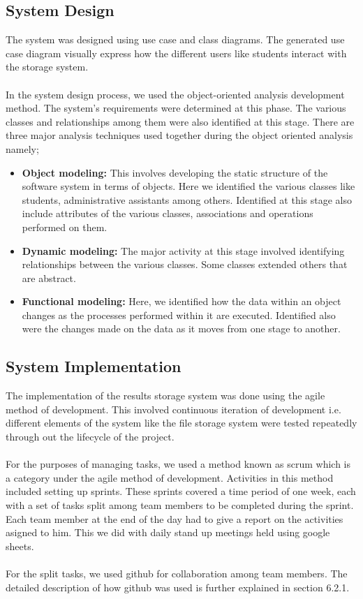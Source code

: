\subsection{System Design}
The system was designed using use case and class diagrams. The generated use case diagram visually express how the different users like students interact with the storage system. \\~\\
In the system design process, we used the object-oriented analysis development method. The system’s requirements were determined at this phase. The various classes and relationships among them were also identified at this stage. There are three major analysis techniques used together during the object oriented analysis namely;
\begin{itemize}
\item \textbf{Object modeling:} This involves developing the static structure of the software system in terms of objects. Here we identified the various classes like students, administrative assistants among others. Identified at this stage also include attributes of the various classes, associations and operations performed on them.
\item \textbf{Dynamic modeling:} The major activity at this stage involved identifying relationships between the various classes. Some classes extended others that are abstract.  
\item \textbf{Functional modeling:} Here, we identified how the data within an object changes as the processes performed within it are executed. Identified also were the changes made on the data as it moves from one stage to another.
\end{itemize}

\subsection{System Implementation}
The implementation of the results storage system was done using the agile method of development. This involved continuous iteration  of development i.e. different elements of the system like the file storage system were tested repeatedly through out the lifecycle of the project.\\~\\
For the purposes of managing tasks, we used a method known as scrum which is a category under the agile method of development. Activities in this method included setting up sprints. These sprints covered a time period of one week, each with a set of tasks split among team members to be completed during the sprint. Each team member at the end of the day had to give a report on the activities asigned to him. This we did with daily stand up meetings held using google sheets\cite{art14}.\\~\\
For the split tasks, we used github for collaboration among team members. The detailed description of how github was used is further explained in section 6.2.1.

